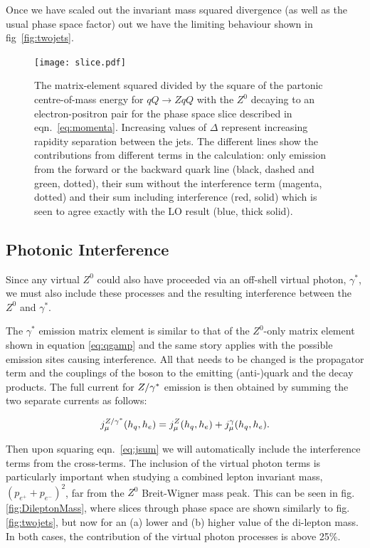 		Once we have scaled out the invariant mass squared divergence (as well as the usual phase
		space factor) out we have the limiting behaviour shown in fig~\eqref{fig:twojets}.

		\begin{figure}[hbt]
		  \begin{center}
		    \texttt{[image: slice.pdf]}
		    \caption{The matrix-element squared divided by the square of the partonic
		      centre-of-mass energy for $qQ\to ZqQ$ with the $Z^0$ decaying to an
		      electron-positron pair for the phase space slice described in
		      eqn.~\eqref{eq:momenta}.  Increasing values of $\Delta$ represent
		      increasing rapidity separation between the jets.  The different lines show the contributions from
		      different terms in the calculation: only emission from the forward or the
		      backward quark line (black, dashed and green, dotted), their sum without
		      the interference term (magenta, dotted) and their sum including
		      interference (red, solid) which is seen to agree exactly with the LO result
		      (blue, thick solid).}
		    \label{fig:twojets}
		  \end{center}
		\end{figure}

	\subsection{Photonic Interference}

		Since any virtual $Z^0$ could also have proceeded via an off-shell virtual photon,
		$\gamma^*$, we must also include these processes and the resulting interference
		between the $Z^0$ and $\gamma^*$.

		The $\gamma^*$ emission matrix element is similar to that of the $Z^0$-only matrix
		element shown in equation \eqref{eq:qgamp} and the same story applies with the
		possible emission sites causing interference.  All that needs to be changed is the
		propagator term and the couplings of the boson to the emitting (anti-)quark and
		the decay products.  The full current for $Z/\gamma^*$ emission is then obtained by summing
		the two separate currents as follows:

		\begin{align}
			\label{eq:jsum}
			j^{Z/\gamma^*}_\mu(h_q,h_e) = j^Z_\mu(h_q,h_e) + j^\gamma_\mu(h_q,h_e).
		\end{align}

		Then upon squaring eqn.~\eqref{eq:jsum} we will automatically include the interference
		terms from the cross-terms. The inclusion of the virtual photon terms is particularly
		important when studying a combined lepton invariant mass, $(p_{e^+} + p_{e^-})^2$,
		far from the $Z^0$ Breit-Wigner mass peak. This can be seen in fig. \eqref{fig:DileptonMass},
		where slices through phase space are shown similarly to fig. \eqref{fig:twojets}, but
		now for an (a) lower and (b) higher value of the di-lepton mass.  In both cases, the
		contribution of the virtual photon processes is above 25\%.

